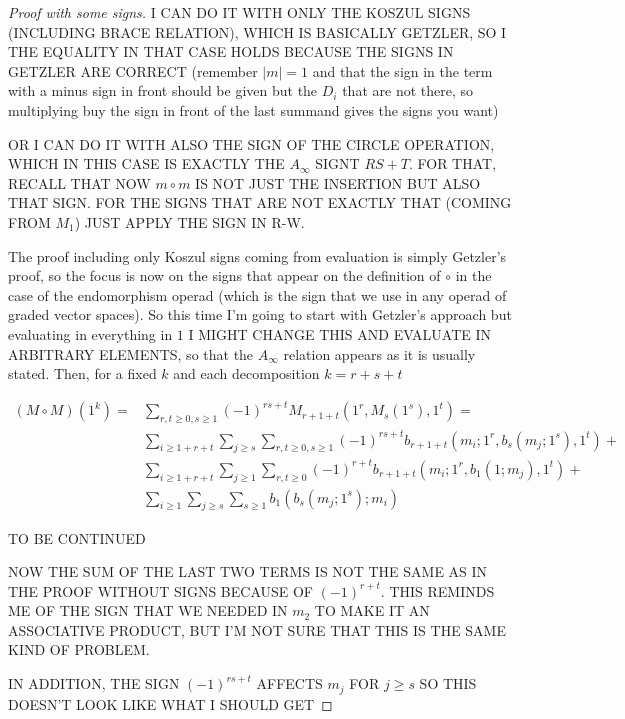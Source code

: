 \documentclass[twoside]{article}
\begin{document}
\begin{proof}[Proof with some signs]

I CAN DO IT WITH ONLY THE KOSZUL SIGNS (INCLUDING BRACE RELATION), WHICH IS BASICALLY GETZLER, SO I THE EQUALITY IN THAT CASE HOLDS BECAUSE THE SIGNS IN GETZLER ARE CORRECT (remember $|m|=1$ and that the sign in the term with a minus sign in front should be given but the $D_i$ that are not there, so multiplying buy the sign in front of the last summand gives the signs you want)

OR I CAN DO IT WITH ALSO THE SIGN OF THE CIRCLE OPERATION, WHICH IN THIS CASE IS EXACTLY THE $A_\infty$ SIGNT $RS+T$. FOR THAT, RECALL THAT NOW $m\circ m$ IS NOT JUST THE INSERTION BUT ALSO THAT SIGN. FOR THE SIGNS THAT ARE NOT EXACTLY THAT (COMING FROM $M_1$) JUST APPLY THE SIGN IN R-W. 


The proof including only Koszul signs coming from evaluation is simply Getzler's proof, so the focus is now on the signs that appear on the definition of $\circ$ in the case of the endomorphism operad (which is the sign that we use in any operad of graded vector spaces). So this time I'm going to start with Getzler's approach but evaluating in everything in $1$ I MIGHT CHANGE THIS AND EVALUATE IN ARBITRARY ELEMENTS, so that the $A_\infty$ relation appears as it is usually stated. Then, for a fixed $k$ and each decomposition $k=r+s+t$

\begin{align*}
(M\circ M)(1^k)=&\sum_{r,t\geq 0, s\geq 1}(-1)^{rs+t}M_{r+1+t}(1^{ r}, M_s(1^{s}),1^t)=\\
&\sum_{i\geq 1+r+t}\sum_{j\geq s}\sum_{r,t\geq 0, s\geq 1}(-1)^{rs+t}b_{r+1+t}(m_i;1^{ r}, b_s(m_j;1^{s}),1^t)+\\
&\sum_{i\geq 1+r+t}\sum_{j\geq 1}\sum_{r,t\geq 0}(-1)^{r+t}b_{r+1+t}(m_i;1^{r}, b_1(1;m_j),1^t)+\\
&\sum_{i\geq 1}\sum_{j\geq s}\sum_{s\geq 1}b_{1}(b_s(m_j;1^{s});m_i)
\end{align*}

TO BE CONTINUED

NOW THE SUM OF THE LAST TWO TERMS IS NOT THE SAME AS IN THE PROOF WITHOUT SIGNS BECAUSE OF $(-1)^{r+t}$. THIS REMINDS ME OF THE SIGN THAT WE NEEDED IN $m_2$ TO MAKE IT AN ASSOCIATIVE PRODUCT, BUT I'M NOT SURE THAT THIS IS THE SAME KIND OF PROBLEM.

IN ADDITION, THE SIGN $(-1)^{rs+t}$ AFFECTS $m_j$ FOR $j\geq s$ SO THIS DOESN'T LOOK LIKE WHAT I SHOULD GET
\end{proof}
\end{document}
